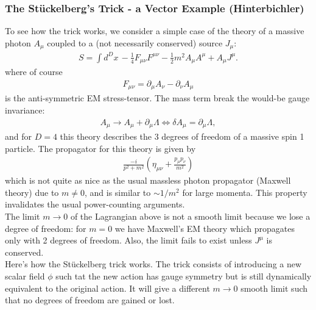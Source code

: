 \documentclass{book}
\theoremstyle{definition}
\newcommand{\p}{\partial}
\newcommand{\f}[2]{\frac{#1}{#2}}
\newcommand{\lp}{\left(}
\newcommand{\rp}{\right)}
\begin{document}
\subsubsection{The St\"{u}ckelberg's Trick - a Vector Example (Hinterbichler)}

To see how the trick works, we consider a simple case of the theory of a massive photon $A_\mu$ coupled to a (not necessarily conserved) source $J_\mu$:
\begin{align}
S = \int d^Dx\, -\f{1}{4}F_{\mu\nu}F^{\mu\nu} - \f{1}{2}m^2 A_\mu A^\mu + A_\mu J^\mu.
\end{align}
where of course
\begin{align}
F_{\mu\nu} = \p_\mu A_\nu - \p_\nu A_\mu
\end{align}
is the anti-symmetric EM stress-tensor. The mass term break the would-be gauge invariance:
\begin{align}
A_\mu \to A_\mu + \p_\mu \Lambda \iff \delta A_\mu = \p_\mu \Lambda,
\end{align}
and for $D=4$ this theory describes the 3 degrees of freedom of a massive spin 1 particle. The propagator for this theory is given by
\begin{align}
\f{-i}{p^2 + m^2}\lp \eta_{\mu\nu} +\f{p_\mu p_\nu}{m^2} \rp
\end{align}
which is not quite as nice as the usual massless photon propagator (Maxwell theory) due to $m\neq 0$, and is similar to $\sim 1/m^2$ for large momenta. This property invalidates the usual power-counting arguments.\\

The limit $m\to 0$ of the Lagrangian above is not a smooth limit because we lose a degree of freedom: for $m=0$ we have Maxwell's EM theory which propagates only with 2 degrees of freedom. Also, the limit fails to exist unless $J^\mu$ is conserved. \\

Here's how the St\"{u}ckelberg trick works. The trick consists of introducing a new scalar field $\phi$ such  tat the new action has gauge symmetry but is still dynamically equivalent to the original action. It will give a different $m\to 0$ smooth limit such that no degrees of freedom are gained or lost. \\
\end{document}
